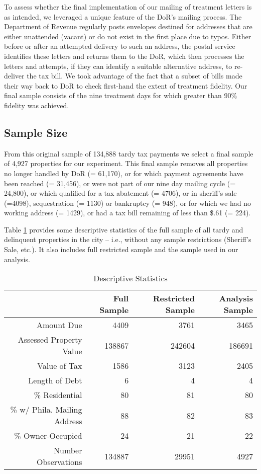 \documentclass[12pt,titlepage]{article}
\begin{document}
To assess whether the final implementation of our mailing of treatment 
letters is as intended, we leveraged a unique feature of the DoR's mailing process.   
The Department of Revenue regularly posts envelopes destined for addresses that are either unattended
(vacant) or do not exist in the first place due to typos. Either
before or after an attempted delivery to such an address, the postal service identifies these letters and returns them to the DoR, which then processes the letters and attempts, if they can identify a suitable
alternative address, to re-deliver the tax bill. We took advantage of
the fact that a subset of bills made their way back to DoR to check
first-hand the extent of treatment fidelity. Our final sample consists
of the nine treatment days for which greater than 90\% fidelity was
achieved.

\subsection{Sample Size}

From this original sample of 134,888 tardy tax payments we select a final sample of 4,927 properties for our experiment.  This final sample removes all properties no longer handled by DoR (= 61,170), or for which payment agreements have been reached (= 31,456), or were not part of our nine day mailing cycle (= 24,800), or which qualified for a tax abatement (= 4706), or in sheriff's sale (=4098), sequestration (= 1130) or bankruptcy (= 948), or for which we had no working address (= 1429), or had a tax bill remaining of less than \$.61 (= 224). 

Table \ref{table:ds} provides some descriptive statistics of the full sample of all
tardy and delinquent properties in the city -- i.e., without any sample restrictions (Sheriff's Sale, etc.). It also includes full restricted sample and the sample used in our analysis. 

\begin{table}[htbp]
\centering
\caption{Descriptive Statistics}\label{table:ds}
\begin{tabular}{rrrr}
  \hline
 & Full Sample & Restricted Sample & Analysis Sample \\ 
  \hline
Amount Due & 4409 & 3761 & 3465 \\ 
  Assessed Property Value & 138867 & 242604 & 186691 \\ 
  Value of Tax & 1586 & 3123 & 2405 \\ 
  Length of Debt & 6 & 4 & 4 \\ 
  \% Residential & 80 & 81 & 80 \\ 
  \% w/ Phila. Mailing Address & 88 & 82 & 83 \\ 
  \% Owner-Occupied & 24 & 21 & 22 \\ 
  Number Observations & 134887 & 29951 & 4927 \\ 
   \hline
\end{tabular}
\end{table}
\end{document}
